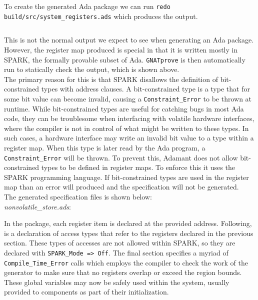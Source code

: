 To create the generated Ada package we can run \texttt{redo build/src/system\_registers.ads} which produces the output.

\vspace{5mm} %
\inputminted{text}{../example_architecture/register_map/output.txt}
\vspace{5mm} %

This is not the normal output we expect to see when generating an Ada package. However, the register map produced is special in that it is written mostly in SPARK, the formally provable subset of Ada. \texttt{GNATprove} is then automatically run to statically check the output, which is shown above. \\

The primary reason for this is that SPARK disallows the definition of bit-constrained types with address clauses. A bit-constrained type is a type that for some bit value can become invalid, causing a \texttt{Constraint\_Error} to be thrown at runtime. While bit-constrained types are useful for catching bugs in most Ada code, they can be troublesome when interfacing with volatile hardware interfaces, where the compiler is not in control of what might be written to these types. In such cases, a hardware interface may write an invalid bit value to a type within a register map. When this type is later read by the Ada program, a \texttt{Constraint\_Error} will be thrown. To prevent this, Adamant does not allow bit-constrained types to be defined in register maps. To enforce this it uses the SPARK programming language. If bit-constrained types are used in the register map than an error will produced and the specification will not be generated. \\

The generated specification files is shown below: \\

\textit{nonvolatile\_store.ads}:

In the package, each register item is declared at the provided address. Following, is a declaration of access types that refer to the registers declared in the previous section. These types of accesses are not allowed within SPARK, so they are declared with \texttt{SPARK\_Mode => Off}. The final section specifies a myriad of \texttt{Compile\_Time\_Error} calls which employs the compiler to check the work of the generator to make sure that no registers overlap or exceed the region bounds. These global variables may now be safely used within the system, usually provided to components as part of their initialization. \\


